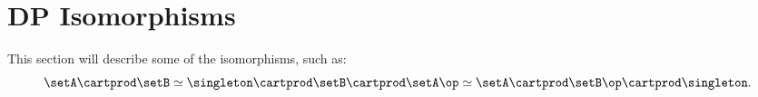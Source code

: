 
\section{DP Isomorphisms}

\begin{publictodo}
    This section will describe some of the isomorphisms, such as:
    \begin{equation}
        \setA \cartprod \setB \simeq \singleton \cartprod \setB \cartprod \setA \op \simeq \setA \cartprod \setB\op \cartprod \singleton.
    \end{equation}
\end{publictodo}

